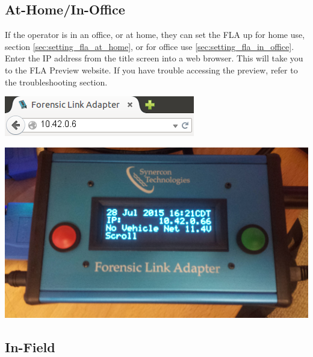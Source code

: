 \documentclass[11pt, oneside]{book}
\begin{document}
\subsection{At-Home/In-Office}
If the operator is in an office, or at home, they can set the FLA up for home use, section \ref{sec:setting_fla_at_home}, or for office use \ref{sec:setting_fla_in_office}. Enter the IP address from the title screen into a web browser. This will take you to the FLA Preview website. If you have trouble accessing the preview, refer to the troubleshooting section.
\\[\baselineskip]
\noindent\begin{minipage}{0.45\textwidth}%
	\includegraphics[width=\linewidth]{../media/fla_preview_screenshots/url_correct} 
\end{minipage}%
\hfill%
\begin{minipage}{0.45\textwidth} 
	\includegraphics[width=\linewidth]{../media/fla_screens/title_screen_no_veh_net} 
\end{minipage}
\subsection{In-Field}
\end{document}
